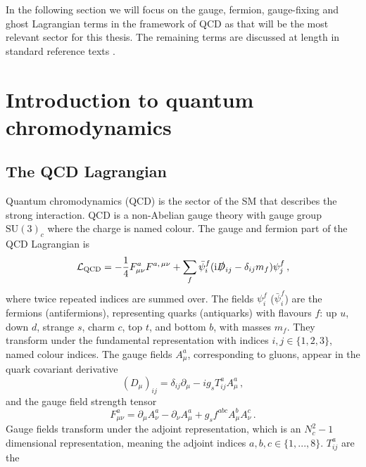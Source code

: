 \documentclass[main.tex]{subfiles}
\begin{document}
    In the following section we will focus on the gauge, fermion, gauge-fixing
    and ghost Lagrangian terms in the framework of QCD as that will be the
    most relevant sector for this thesis. The remaining terms are discussed at
    length in standard reference texts \cite{Peskin:1995ev,Schwartz:2014sze,Romao:2012pq}.


\section{Introduction to quantum chromodynamics}\label{sec:qcd}
    \subsection{The QCD Lagrangian}\label{sec:L_qcd}
    Quantum chromodynamics (QCD) is the sector of the SM that
    describes the strong interaction. 
    QCD is a non-Abelian gauge theory with gauge group
    $\mathrm{SU}(3)_{c}$ where the charge is named colour.
    The gauge and fermion part of the QCD Lagrangian is
    \begin{equation}\label{eqn:L_QCD}
        \mathcal{L}_{\mathrm{QCD}} = -\dfrac{1}{4}F^{a}_{\mu\nu}F^{a, \, \mu\nu}
        + \sum_{f} \bar{\psi}_{i}^{f}(\mathrm{i}\slashed{D}_{ij} - \delta_{ij}m_{f})\psi_{j}^{f} \, ,
    \end{equation}
    where twice repeated indices are summed over.
    The fields $\psi_{i}^{f}$ ($\bar{\psi}_{i}^{f}$) are the fermions (antifermions),
    representing quarks (antiquarks) with flavours $f$: 
    up $u$, down $d$, strange $s$, charm $c$, top $t$, and bottom $b$,
    with masses $m_{f}$. They transform under the fundamental
    representation with indices $i, j \in \{1, 2, 3\}$, named colour indices.
    The gauge fields $A^{a}_{\mu}$, corresponding to gluons, 
    appear in the quark covariant derivative
    \begin{equation}\label{eqn:covariant_deriv}
        (D_{\mu})_{ij} = \delta_{ij}\partial_{\mu} - ig_{s}T^{a}_{ij}A^{a}_{\mu} \, ,
    \end{equation}
    and the gauge field strength tensor
    \begin{equation}\label{eqn:F_munu}
        F^{a}_{\mu\nu} = \partial_{\mu}A^{a}_{\nu} - \partial_{\nu}A^{a}_{\mu} + g_{s} f^{abc}A^{b}_{\mu}A^{c}_{\nu} \, .
    \end{equation}
    Gauge fields transform under the adjoint representation, 
    which is an $N_{c}^{2}-1$ dimensional representation, meaning
    the adjoint indices $a,b,c \in \{1,...,8\}$. $T^{a}_{ij}$ are the
\end{document}
